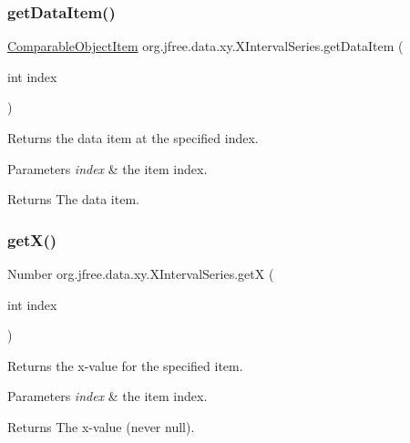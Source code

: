 \subsubsection{\texorpdfstring{get\+Data\+Item()}{getDataItem()}}
{\footnotesize\ttfamily \mbox{\hyperlink{classorg_1_1jfree_1_1data_1_1_comparable_object_item}{Comparable\+Object\+Item}} org.\+jfree.\+data.\+xy.\+X\+Interval\+Series.\+get\+Data\+Item (\begin{DoxyParamCaption}\item[{int}]{index }\end{DoxyParamCaption})}

Returns the data item at the specified index.


\begin{DoxyParams}{Parameters}
{\em index} & the item index.\\
\hline
\end{DoxyParams}
\begin{DoxyReturn}{Returns}
The data item. 
\end{DoxyReturn}
\mbox{\label{classorg_1_1jfree_1_1data_1_1xy_1_1_x_interval_series_ab8858df46004e2277aa4a4eb55e7cc93}} 
\subsubsection{\texorpdfstring{get\+X()}{getX()}}
{\footnotesize\ttfamily Number org.\+jfree.\+data.\+xy.\+X\+Interval\+Series.\+getX (\begin{DoxyParamCaption}\item[{int}]{index }\end{DoxyParamCaption})}

Returns the x-\/value for the specified item.


\begin{DoxyParams}{Parameters}
{\em index} & the item index.\\
\hline
\end{DoxyParams}
\begin{DoxyReturn}{Returns}
The x-\/value (never {\ttfamily null}). 
\end{DoxyReturn}
\mbox{\label{classorg_1_1jfree_1_1data_1_1xy_1_1_x_interval_series_a0ee012b69f57b957bfa56048d9588094}} 
